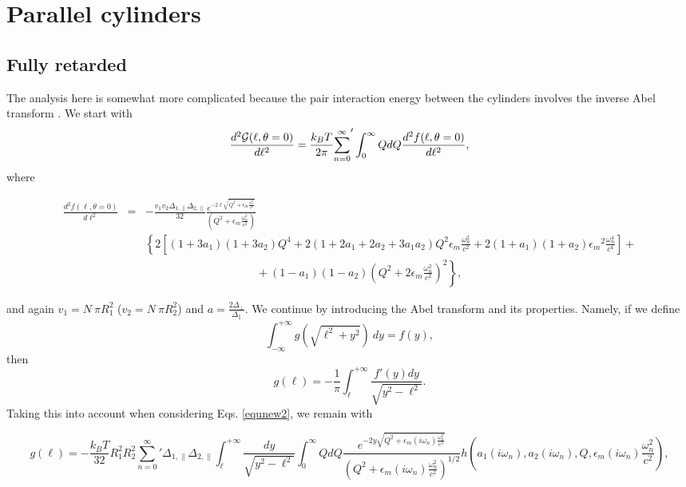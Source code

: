 \documentclass[onecolumn,letterpaper,amsmath,amssymb,floatfix,aps,superscriptaddress]{revtex4}
\begin{document}
\section{Parallel cylinders}

\subsection{Fully retarded}

The analysis here is somewhat more complicated because the pair interaction energy between the cylinders involves the inverse Abel transform \cite{Abel}. We start with
\begin{equation}
\frac{d^{2}{\cal G}(\ell,\theta = 0)}{d\ell^{2}} = \frac{k_BT}{2\pi} {\sum_{n=0}^{\infty}}' \int_0^{\infty} Q dQ \frac{d^{2}f(\ell,\theta = 0)}{d\ell^{2}},
\label{equnew1}
\end{equation}
where  
\begin{widetext}
\begin{eqnarray}
\frac{d^{2}f(\ell,\theta = 0)}{d\ell^{2}} &=& - \frac{v_1 v_2 \Delta_{1,\parallel} \Delta_{2,\parallel}}{32} 
\frac{e^{-2 \ell \sqrt{Q^{2} + \epsilon_m \frac{\omega_n^{2}}{c^{2}}}}}{(Q^{2} + \epsilon_m \frac{\omega_n^{2}}{c^{2}})} \nonumber \\
& & \left \{ 2 \left [ (1+3a_1)(1+3a_2) Q^{4} + 2 (1+2a_1+2a_2+3a_1a_2) Q^{2} \epsilon_m \frac{\omega_n^{2}}{c^{2}} + 2(1+a_1)(1+a_2) 
{\epsilon_m}^{2} \frac{\omega_n^{4}}{c^{4}}\right] \right. + \nonumber\\
& &~~~~~~~~~~~~~~~~~~~~~~~~~~~~~~~~~~~~~~~~~~~~~ +  \left. (1-a_1)(1-a_2)(Q^{2} + 2 \epsilon_m \frac{\omega_n^{2}}{c^{2}})^2 \right \},
\label{equnew2}
\end{eqnarray}
\end{widetext}
and again $v_1 = N~\pi R_1^{2}$ ($v_2 = N~\pi R_2^{2}$) and $a = \frac{2 \Delta_{\perp}}{\Delta_{\parallel}}$. We continue by introducing the Abel transform and its properties. Namely, if we define
\begin{equation}
\int_{-\infty}^{+\infty}g(\sqrt{\ell^{2}+y^{2}})~dy = f(y),
\end{equation} 
then
\begin{equation}
g(\ell) = - \frac{1}{\pi} \int_{\ell}^{+\infty} \frac{f'(y) dy}{\sqrt{y^2 - \ell^2}}.
\end{equation} 
Taking this into account when considering Eqs. \ref{equnew2}, we remain with 
\begin{widetext}
\begin{equation}
g(\ell) = - \frac{k_BT}{32} {R_1^{2} R_2^{2}} 
{\sum_{n=0}^{\infty}}' \Delta_{1,\parallel} \Delta_{2,\parallel} \int_{\ell}^{+\infty}\!\!\!\!\! \frac{dy}{\sqrt{y^2 - \ell^2}} \int_0^{\infty}\!\!\!  
Q dQ \frac{e^{-2 y \sqrt{Q^{2} + \epsilon_m(i \omega_n) \frac{\omega_n^{2}}{c^{2}}}}}{(Q^{2} + \epsilon_m(i \omega_n) \frac{\omega_n^{2}}{c^{2}})^{1/2}} 
h(a_1(i \omega_n), a_2(i \omega_n), Q, \epsilon_m(i \omega_n) \frac{\omega_n^{2}}{c^{2}}),
\end{equation} 
\end{widetext}
\end{document}
